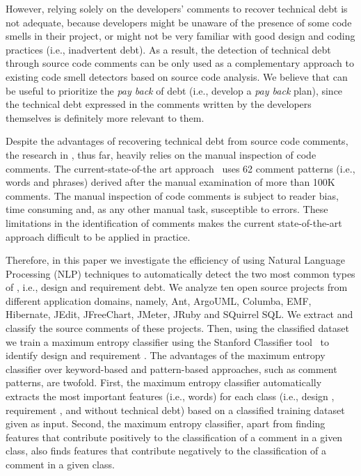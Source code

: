 However, relying solely on the developers' comments to recover technical debt is not adequate, because developers might be unaware of the presence of some code smells in their project, or might not be very familiar with good design and coding practices (i.e., inadvertent debt).
As a result, the detection of technical debt through source code comments can be only used as a complementary approach to existing code smell detectors based on source code analysis.
We believe that \SATD can be useful to prioritize the \textit{pay back} of debt (i.e., develop a \textit{pay back} plan), since the technical debt expressed in the comments written by the developers themselves is definitely more relevant to them.

Despite the advantages of recovering technical debt from source code comments, the research in \SATD, thus far, heavily relies on the manual inspection of code comments. The current-state-of-the art approach~\cite{Potdar2014ICSME} uses 62 comment patterns (i.e., words and phrases) derived after the manual examination of more than 100K comments. The manual inspection of code comments is subject to reader bias, time consuming and, as any other manual task, susceptible to errors. These limitations in the identification of \SATD comments makes the current state-of-the-art approach difficult to be applied in practice.

Therefore, in this paper we investigate the efficiency of using Natural Language Processing (NLP) techniques to automatically detect the two most common types of \SATD, i.e., design and requirement debt. We analyze ten open source projects from different application domains, namely, Ant, ArgoUML, Columba, EMF, Hibernate, JEdit, JFreeChart, JMeter, JRuby and SQuirrel SQL. We extract and classify the source comments of these projects. Then, using the classified dataset we train a maximum entropy classifier using the Stanford Classifier tool~\cite{manning2003optimization} to identify design and requirement \SATD.
The advantages of the maximum entropy classifier over keyword-based and pattern-based approaches, such as comment patterns, are twofold. First, the maximum entropy classifier automatically extracts the most important features (i.e., words) for each class (i.e., design \SATD, requirement \SATD, and without technical debt) based on a classified training dataset given as input. Second, the maximum entropy classifier, apart from finding features that contribute positively to the classification of a comment in a given class, also finds features that contribute negatively to the classification of a comment in a given class.

